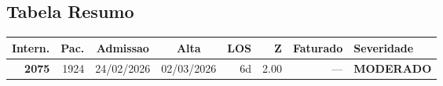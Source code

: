 \documentclass[a4paper,10pt]{article}
\begin{document}
\subsection{Tabela Resumo}
\begin{center}
\begin{longtable}{>{\scriptsize}r>{\scriptsize}r>{\scriptsize}c>{\scriptsize}c>{\scriptsize}r>{\scriptsize}r>{\scriptsize}r>{\scriptsize}l}
\toprule
\textbf{Intern.} & \textbf{Pac.} & \textbf{Admissao} & \textbf{Alta} & \textbf{LOS} & \textbf{Z} & \textbf{Faturado} & \textbf{Severidade} \\
\midrule
\endhead
\bottomrule
\endfoot

\textcolor{anomyellow}{\textbf{2075}} & 1924 & 24/02/2026 & 02/03/2026 & 6d & \textcolor{anomyellow}{2.00} & --- & \textcolor{anomyellow}{\textbf{MODERADO}} \\

\end{longtable}\end{center}
\end{document}
